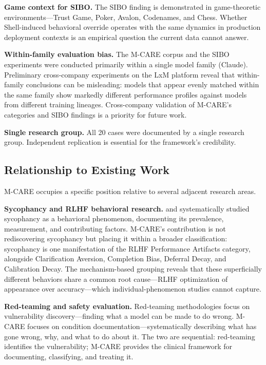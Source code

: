 \documentclass[11pt]{article}
\begin{document}
\textbf{Game context for SIBO.} The SIBO finding is demonstrated in game-theoretic environments---Trust Game, Poker, Avalon, Codenames, and Chess. Whether Shell-induced behavioral override operates with the same dynamics in production deployment contexts is an empirical question the current data cannot answer.

\textbf{Within-family evaluation bias.} The M-CARE corpus and the SIBO experiments were conducted primarily within a single model family (Claude). Preliminary cross-company experiments on the LxM platform reveal that within-family conclusions can be misleading: models that appear evenly matched within the same family show markedly different performance profiles against models from different training lineages. Cross-company validation of M-CARE's categories and SIBO findings is a priority for future work.

\textbf{Single research group.} All 20 cases were documented by a single research group. Independent replication is essential for the framework's credibility.

\subsection{Relationship to Existing Work}

M-CARE occupies a specific position relative to several adjacent research areas.

\textbf{Sycophancy and RLHF behavioral research.} \citet{Perez2022} and \citet{Sharma2023} systematically studied sycophancy as a behavioral phenomenon, documenting its prevalence, measurement, and contributing factors. M-CARE's contribution is not rediscovering sycophancy but placing it within a broader classification: sycophancy is one manifestation of the RLHF Performance Artifacts category, alongside Clarification Aversion, Completion Bias, Deferral Decay, and Calibration Decay. The mechanism-based grouping reveals that these superficially different behaviors share a common root cause---RLHF optimization of appearance over accuracy---which individual-phenomenon studies cannot capture.

\textbf{Red-teaming and safety evaluation.} Red-teaming methodologies \citep{Ganguli2022} focus on vulnerability discovery---finding what a model can be made to do wrong. M-CARE focuses on condition documentation---systematically describing what has gone wrong, why, and what to do about it. The two are sequential: red-teaming identifies the vulnerability; M-CARE provides the clinical framework for documenting, classifying, and treating it.
\end{document}
